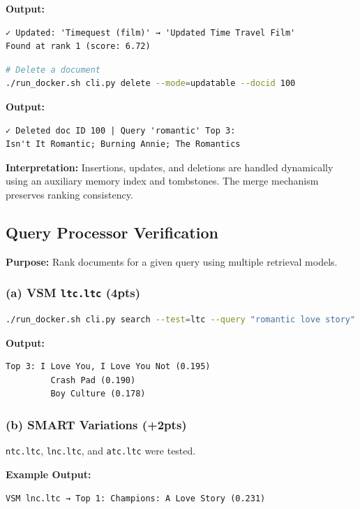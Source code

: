 \documentclass[11pt,a4paper]{article}
\begin{document}
\noindent\textbf{Output:}
\begin{lstlisting}
✓ Updated: 'Timequest (film)' → 'Updated Time Travel Film'
Found at rank 1 (score: 6.72)
\end{lstlisting}

\begin{lstlisting}[language=bash]
# Delete a document
./run_docker.sh cli.py delete --mode=updatable --docid 100
\end{lstlisting}

\noindent\textbf{Output:}
\begin{lstlisting}
✓ Deleted doc ID 100 | Query 'romantic' Top 3:
Isn't It Romantic; Burning Annie; The Romantics
\end{lstlisting}

\noindent\textbf{Interpretation:}  
Insertions, updates, and deletions are handled dynamically using an auxiliary memory
index and tombstones. The merge mechanism preserves ranking consistency.

\subsection{Query Processor Verification}
\noindent\textbf{Purpose:} Rank documents for a given query using multiple retrieval models.

\subsubsection*{(a) VSM \texttt{ltc.ltc} (4pts)}

\begin{lstlisting}[language=bash]
./run_docker.sh cli.py search --test=ltc --query "romantic love story"
\end{lstlisting}

\noindent\textbf{Output:}
\begin{lstlisting}
Top 3: I Love You, I Love You Not (0.195)
         Crash Pad (0.190)
         Boy Culture (0.178)
\end{lstlisting}

\subsubsection*{(b) SMART Variations (+2pts)}

\texttt{ntc.ltc}, \texttt{lnc.ltc}, and \texttt{atc.ltc} were tested.

\noindent\textbf{Example Output:}
\begin{lstlisting}
VSM lnc.ltc → Top 1: Champions: A Love Story (0.231)
\end{lstlisting}
\end{document}
